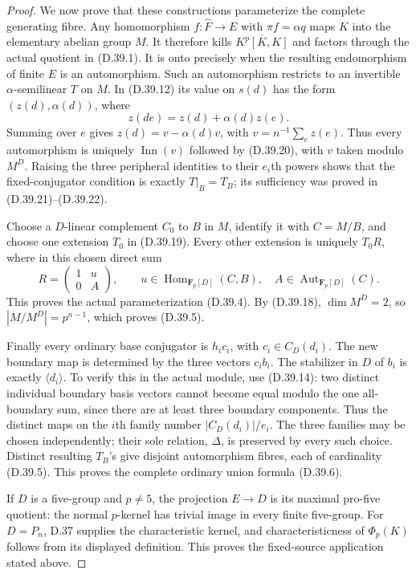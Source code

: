 \begin{proof}
We now prove that these constructions parameterize
the complete generating fibre.
Any homomorphism \(f:\widehat F\to E\) with
\(\pi f=\alpha q\) maps \(K\) into the elementary
abelian group \(M\).  It therefore kills
\(\overline{K^p[K,K]}\) and factors through the
actual quotient in \textup{(D.39.1)}.
It is onto precisely when the resulting
endomorphism of finite \(E\) is an automorphism.
Such an automorphism restricts to an invertible
\(\alpha\)-semilinear \(T\) on \(M\).
In \textup{(D.39.12)} its value on \(s(d)\)
has the form \((z(d),\alpha(d))\), where
\[
 z(de)=z(d)+\alpha(d)z(e).
 \tag{D.39.23}
\]
Summing over \(e\) gives
\(z(d)=v-\alpha(d)v\), with
\(v=n^{-1}\sum_e z(e)\).
Thus every automorphism is uniquely
\(\operatorname{Inn}(v)\) followed by
\textup{(D.39.20)}, with \(v\) taken modulo
\(M^D\).
Raising the three peripheral identities to
their \(e_i\)th powers shows that the
fixed-conjugator condition is exactly
\(T|_B=T_B\); its sufficiency was proved in
\textup{(D.39.21)--(D.39.22)}.

Choose a \(D\)-linear complement \(C_0\) to
\(B\) in \(M\), identify it with \(C=M/B\),
and choose one extension \(T_0\) in
\textup{(D.39.19)}.
Every other extension is uniquely \(T_0 R\), where
in this chosen direct sum
\[
       R=\begin{pmatrix}1&u\\0&A\end{pmatrix},
       \qquad
       u\in\operatorname{Hom}_{\mathbf F_p[D]}(C,B),
       \quad A\in\operatorname{Aut}_{\mathbf F_p[D]}(C).
 \tag{D.39.24}
\]
This proves the actual parameterization
\textup{(D.39.4)}.
By \textup{(D.39.18)}, \(\dim M^D=2\), so
\(|M/M^D|=p^{n-1}\), which proves
\textup{(D.39.5)}.

Finally every ordinary base conjugator is
\(h_i c_i\), with \(c_i\in C_D(d_i)\).
The new boundary map is determined by the
three vectors \(c_i b_i\).
The stabilizer in \(D\) of \(b_i\) is exactly
\(\langle d_i\rangle\).
To verify this in the actual module, use
\textup{(D.39.14)}: two distinct individual
boundary basis vectors cannot become equal
modulo the one all-boundary sum, since there
are at least three boundary components.
Thus the distinct maps on the \(i\)th family
number \(|C_D(d_i)|/e_i\).
The three families may be chosen independently;
their sole relation, \(\Delta\), is preserved
by every such choice.
Distinct resulting \(T_B\)'s give disjoint
automorphism fibres, each of cardinality
\textup{(D.39.5)}.  This proves the complete
ordinary union formula \textup{(D.39.6)}.

If \(D\) is a five-group and \(p\ne5\),
the projection \(E\to D\) is its maximal
pro-five quotient: the normal \(p\)-kernel
has trivial image in every finite five-group.
For \(D=P_n\), D.37 supplies the characteristic
kernel, and characteristicness of
\(\Phi_p(K)\) follows from its displayed
definition.  This proves the fixed-source
application stated above.
\end{proof}

